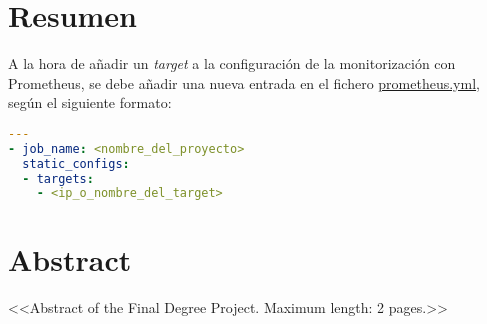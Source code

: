 \chapter*{Resumen}

A la hora de añadir un \textit{target} a la configuración de la monitorización con Prometheus, se debe añadir una nueva entrada en el fichero \url{prometheus.yml}, según el siguiente formato:

\begin{lstlisting}[language=Yaml,frame=single,caption=prometheus.yml]
---
- job_name: <nombre_del_proyecto>
  static_configs:
  - targets:
    - <ip_o_nombre_del_target>
\end{lstlisting}


\newpage

\chapter*{Abstract}

<<Abstract of the Final Degree Project. Maximum length: 2 pages.>>


